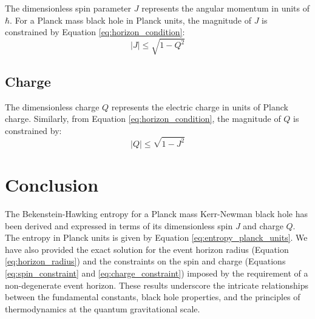	The dimensionless spin parameter $J$ represents the angular momentum in units of $\hbar$. For a Planck mass black hole in Planck units, the magnitude of $J$ is constrained by Equation \eqref{eq:horizon_condition}:
	\begin{equation}
		|J| \le \sqrt{1 - Q^2}
		\label{eq:spin_constraint}
	\end{equation}
	
	\subsection{Charge}
	
	The dimensionless charge $Q$ represents the electric charge in units of Planck charge. Similarly, from Equation \eqref{eq:horizon_condition}, the magnitude of $Q$ is constrained by:
	\begin{equation}
		|Q| \le \sqrt{1 - J^2}
		\label{eq:charge_constraint}
	\end{equation}
	
	\section{Conclusion}
	
	The Bekenstein-Hawking entropy for a Planck mass Kerr-Newman black hole has been derived and expressed in terms of its dimensionless spin $J$ and charge $Q$. The entropy in Planck units is given by Equation \eqref{eq:entropy_planck_units}. We have also provided the exact solution for the event horizon radius (Equation \eqref{eq:horizon_radius}) and the constraints on the spin and charge (Equations \eqref{eq:spin_constraint} and \eqref{eq:charge_constraint}) imposed by the requirement of a non-degenerate event horizon. These results underscore the intricate relationships between the fundamental constants, black hole properties, and the principles of thermodynamics at the quantum gravitational scale.
	
